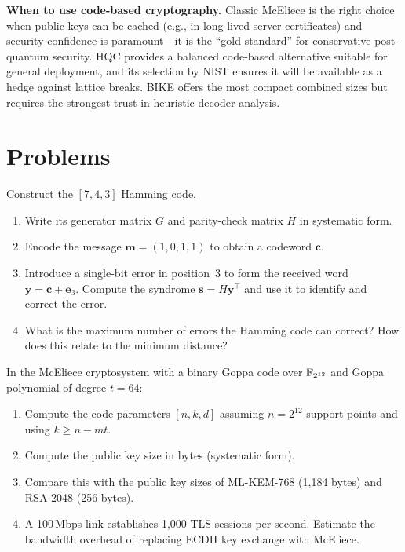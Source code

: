 \begin{svgraybox}
\textbf{When to use code-based cryptography.}
Classic McEliece is the right choice when public keys can be cached (e.g., in long-lived server certificates) and security confidence is paramount---it is the ``gold standard'' for conservative post-quantum security.  HQC provides a balanced code-based alternative suitable for general deployment, and its selection by NIST ensures it will be available as a hedge against lattice breaks.  BIKE offers the most compact combined sizes but requires the strongest trust in heuristic decoder analysis.
\end{svgraybox}


\section*{Problems}

\begin{prob}
\label{prob:ch09-hamming}
Construct the $[7,4,3]$ Hamming code.
\begin{enumerate}
\item[(a)] Write its generator matrix $G$ and parity-check matrix $H$ in systematic form.
\item[(b)] Encode the message $\mathbf{m} = (1,0,1,1)$ to obtain a codeword $\mathbf{c}$.
\item[(c)] Introduce a single-bit error in position~$3$ to form the received word $\mathbf{y} = \mathbf{c} + \mathbf{e}_3$.  Compute the syndrome $\mathbf{s} = H\mathbf{y}^\top$ and use it to identify and correct the error.
\item[(d)] What is the maximum number of errors the Hamming code can correct?  How does this relate to the minimum distance?
\end{enumerate}
\end{prob}

\begin{prob}
\label{prob:ch09-mceliece-keysize}
In the McEliece cryptosystem with a binary Goppa code over $\mathbb{F}_{2^{12}}$ and Goppa polynomial of degree $t = 64$:
\begin{enumerate}
\item[(a)] Compute the code parameters $[n, k, d]$ assuming $n = 2^{12}$ support points and using $k \geq n - mt$.
\item[(b)] Compute the public key size in bytes (systematic form).
\item[(c)] Compare this with the public key sizes of ML-KEM-768 (1,184 bytes) and RSA-2048 (256 bytes).
\item[(d)] A 100\,Mbps link establishes 1,000 TLS sessions per second.  Estimate the bandwidth overhead of replacing ECDH key exchange with McEliece.
\end{enumerate}
\end{prob}

